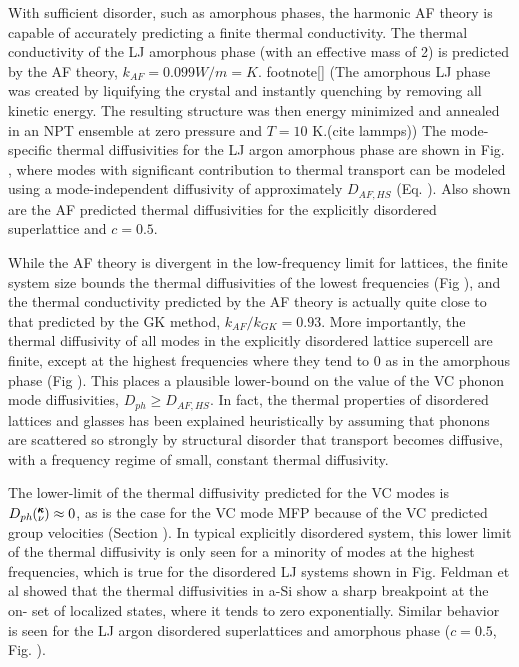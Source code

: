 \documentclass[aps,prb,onecolumn,preprint,superscriptaddress,amsmath,amssymb,floatfix]{revtex4}
\newcommand{\kv}{\mspace{-4.0mu}\left(\mspace{-8.0mu}
\begin{smallmatrix}&\pmb{\kappa} \\&\nu\end{smallmatrix}
\mspace{-3.0mu}\right)}
\begin{document}
With sufficient disorder, such as amorphous phases, the 
harmonic AF theory is capable of accurately predicting a finite 
thermal conductivity.
\cite{feldman_thermal_1993,shenogin_predicting_2009}  
The thermal conductivity of the LJ amorphous phase (with an effective 
mass of 2) is predicted by the AF theory, $k_{AF} = 0.099 W/m=K$.
footnote[]
(The amorphous LJ phase was created by liquifying the crystal 
and instantly quenching by removing all kinetic energy.  The resulting 
structure was then energy minimized and annealed in an NPT ensemble at 
zero pressure and $T=10$ K.(cite lammps))
The mode-specific thermal diffusivities for the LJ argon amorphous phase 
are shown in Fig. , where modes with significant 
contribution to thermal transport can be modeled using a mode-independent 
diffusivity of approximately $D_{AF,HS}$ (Eq. ). 
Also shown are the AF predicted thermal 
diffusivities for the explicitly disordered superlattice and $c=0.5$. 

While the AF theory is divergent in the low-frequency limit for lattices,  
the finite system size bounds the thermal diffusivities of the lowest 
frequencies (Fig ), and the thermal conductivity predicted by the AF theory 
is actually quite close to that predicted by the GK method, 
$k_{AF}/k_{GK} = 0.93$. More importantly, the thermal diffusivity of all 
modes in the explicitly disordered lattice supercell are finite, except 
at the highest frequencies where they tend to 0 as in the amorphous 
phase (Fig ). 
This places a plausible lower-bound on the value of the VC phonon mode 
diffusivities, $D_{ph} \ge D_{AF,HS}$. In fact,
the thermal properties of disordered lattices and glasses
has been explained heuristically by assuming that phonons
are scattered so strongly by structural disorder that transport 
becomes diffusive, with a frequency regime of small,
constant thermal diffusivity.
\cite{kittel_interpretation_1949,sheng_heat_1991}

The lower-limit of the thermal diffusivity predicted for the VC 
modes is $D_{ph}\kv \approx 0$, as is the case for the VC mode 
MFP because of the VC predicted group velocities (Section ). In typical  
explicitly disordered system, this lower limit of the thermal diffusivity 
is only seen for a minority of modes at the highest frequencies, which 
is true for the disordered LJ systems shown in Fig. 
Feldman et al showed that the thermal 
diffusivities in a-Si show a sharp breakpoint at the on-
set of localized states, where it tends to zero exponentially. 
Similar behavior is seen for the LJ argon disordered superlattices 
and amorphous phase 
($c=0.5$, Fig. ). 
\end{document}
